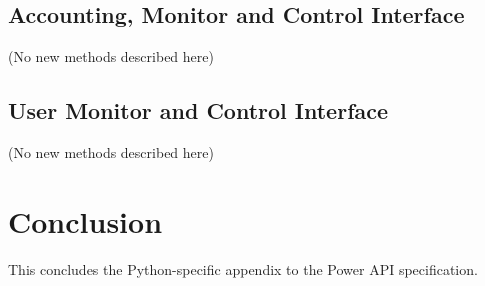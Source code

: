 \documentclass[12pt]{report} %
\providecommand{\DIFaddbegin}{} %
\providecommand{\DIFaddend}{} %
\providecommand{\DIFdelbegin}{} %
\newcommand{\DIFscaledelfig}{0.5}
\newlength{\DIFdelgraphicswidth} %
\newlength{\DIFdelgraphicsheight} %
\newcommand{\DIFaddincludegraphics}[2][]{{\color{blue}\fbox{\DIFOincludegraphics[#1]{#2}}}} %
\newcommand{\DIFdelincludegraphics}[2][]{%
\sbox{\DIFdelgraphicsbox}{\DIFOincludegraphics[#1]{#2}}%
\settoboxwidth{\DIFdelgraphicswidth}{\DIFdelgraphicsbox} %
\settoboxtotalheight{\DIFdelgraphicsheight}{\DIFdelgraphicsbox} %
\scalebox{\DIFscaledelfig}{%
\parbox[b]{\DIFdelgraphicswidth}{\usebox{\DIFdelgraphicsbox}\\[-\baselineskip] \rule{\DIFdelgraphicswidth}{0em}}\llap{\resizebox{\DIFdelgraphicswidth}{\DIFdelgraphicsheight}{%
\setlength{\unitlength}{\DIFdelgraphicswidth}%
\begin{picture}(1,1)%
\thicklines\linethickness{2pt} %
{\color[rgb]{1,0,0}\put(0,0){\framebox(1,1){}}}%
{\color[rgb]{1,0,0}\put(0,0){\line( 1,1){1}}}%
{\color[rgb]{1,0,0}\put(0,1){\line(1,-1){1}}}%
\end{picture}%
}\hspace*{3pt}}} %
} %
\DeclareRobustCommand{\DIFaddbegin}{\DIFOaddbegin \let\includegraphics\DIFaddincludegraphics} %
\DeclareRobustCommand{\DIFaddend}{\DIFOaddend \let\includegraphics\DIFOincludegraphics} %
\DeclareRobustCommand{\DIFdelbegin}{\DIFOdelbegin \let\includegraphics\DIFdelincludegraphics} %
\begin{document}
\begin{appendices}
\subsection{Accounting, Monitor and Control
Interface}\label{sec:PythonAccountingMonitorControlInterface}
(No new methods described here)

\subsection{User Monitor and Control
Interface}\label{sec:PythonUserMonitorControlInterface}
(No new methods described here)

\section{Conclusion}\label{sec:PythonConclusion}
This concludes the Python-specific appendix to the Power API specification.





\DIFaddbegin \end{appendices}
\DIFaddend 

\DIFdelbegin %

\end{document}
